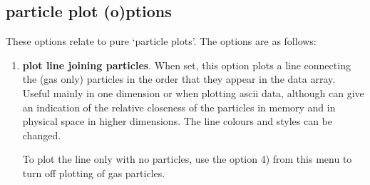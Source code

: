 \documentclass[a4paper,11pt]{article}
\begin{document}
\subsection{particle plot (o)ptions}
 These options relate to pure `particle plots'. The options are as follows:
\begin{enumerate}
\item \textbf{plot line joining particles}. When set, this option plots a line connecting the (gas only) particles
in the order that they appear in the data array. Useful mainly in one dimension or when plotting ascii data, although can give an indication of the
relative closeness of the particles in memory and in physical space in higher dimensions. The line colours and
styles can be changed.

 To plot the line only with no particles, use the option 4) from this menu to turn off
plotting of gas particles.


\end{enumerate}
\end{document}
